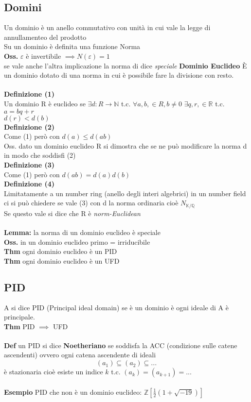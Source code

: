 \documentclass[10pt,a4paper]{article}
\begin{document}
\subsection{Domini}
Un dominio è un anello commutativo con unità in cui vale la legge di annullamenteo del prodotto\\
Su un dominio è definita una funzione Norma\\
\textbf{Oss.} $\varepsilon$ è invertibile $\implies N(\varepsilon)=1$\\
se vale anche l'altra implicazione la norma di dice \textit{speciale}
\textbf{Dominio Euclideo}
È un dominio dotato di una norma in cui è possibile fare la divisione con resto.\\\\
\textbf{Definizione (1)}\\
Un dominio R è euclideo se $\exists d:R \to \mathbb{N}$ t.c.
$\forall a,b, \in R, b\neq 0$ $\exists q,r,\in \mathbb{R}$ t.c.\\
$a= bq+r$\\
$d(r) < d(b)$\\
\textbf{Definizione (2)}\\
Come (1) però con $d(a) \leq d(ab)$\\
Oss. dato un dominio euclideo R si dimostra che se ne può modificare la norma d in modo che soddisfi (2)\\
\textbf{Definizione (3)}\\
Come (1) però con $ d(ab) = d(a)d(b) $\\
\textbf{Definizione (4)}\\
Limitatamente a un number ring (anello degli interi algebrici) in un number field ci si può chiedere se vale (3) con d la norma ordinaria cioè $N_{\mathbb{K}/{\mathbb{Q}}}$\\
Se questo vale si dice che R è \textit{norm-Euclidean}\\\\
\textbf{Lemma:} la norma di un dominio euclideo è speciale\\
\textbf{Oss.} in un dominio euclideo primo = irriducibile\\
\textbf{Thm} ogni dominio euclideo è un PID\\
\textbf{Thm} ogni dominio euclideo è un UFD
\subsection{PID}
A si dice PID (Principal ideal domain) se è un dominio è ogni ideale di A è principale.\\
\textbf{Thm} PID $\implies$ UFD\\\\
\textbf{Def} un PID si dice \textbf{Noetheriano} se soddisfa la ACC (condizione sulle catene ascendenti) ovvero ogni catena ascendente di ideali\\
$$ (a_1) \subseteq (a_2) \subseteq ...$$
è stazionaria cioè esiste un indice $k$ t.c. $(a_k)=(a_{k+1})=...$\\\\
\textbf{Esempio} PID che non è un dominio euclideo: $\mathbb{Z}[\frac{1}{2}(1+\sqrt {-19})]$
\end{document}
